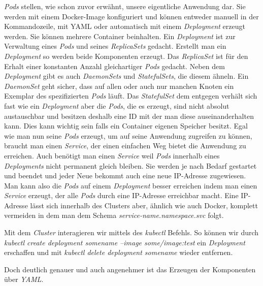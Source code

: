 \documentclass[12pt,a4paper]{scrartcl}
\begin{document}
\emph{Pods} stellen, wie schon zuvor erwähnt, unsere eigentliche Anwendung dar. Sie werden mit einem Docker-Image konfiguriert und können entweder manuell in der Kommandozeile, mit YAML oder automatisch mit einem \emph{Deployment} erzeugt werden. Sie können mehrere Container beinhalten.
Ein \emph{Deployment} ist zur Verwaltung eines \emph{Pods} und seines \emph{ReplicaSets} gedacht. Erstellt man ein \emph{Deployment} so werden beide Komponenten erzeugt.
Das \emph{ReplicaSet} ist für den Erhalt einer konstanten Anzahl gleichartiger \emph{Pods} gedacht. 
Neben dem \emph{Deployment} gibt es auch \emph{DaemonSets} und \emph{StatefulSets}, die diesem ähneln. 
Ein \emph{DaemonSet} geht sicher, dass auf allen oder auch nur manchen Knoten ein Exemplar des spezifizierten \emph{Pods} läuft. 
Das \emph{StatefulSet} dem entgegen verhält sich fast wie ein \emph{Deployment} aber die \emph{Pods}, die es erzeugt, sind nicht absolut austauschbar und besitzen deshalb eine ID mit der man diese auseinanderhalten kann. Dies kann wichtig sein falls ein Container eigenen Speicher besitzt. 
Egal wie man nun seine \emph{Pods} erzeugt, um auf seine Anwendung zugreifen zu können, braucht man einen \emph{Service}, der einen einfachen Weg bietet die Anwendung zu erreichen. Auch benötigt man einen \emph{Service} weil \emph{Pods} innerhalb eines \emph{Deployments} nicht permanent gleich bleiben. Sie werden je nach Bedarf gestartet und beendet und jeder Neue bekommt auch eine neue IP-Adresse zugewiesen. Man kann also die \emph{Pods} auf einem \emph{Deployment} besser erreichen indem man einen \emph{Service} erzeugt, der alle \emph{Pods} durch eine IP-Adresse erreichbar macht. Eine IP-Adresse lässt sich innerhalb des Clusters aber, ähnlich wie auch Docker, komplett vermeiden in dem man dem Schema \emph{service-name.namespace.svc} folgt.

Mit dem \emph{Cluster} interagieren wir mittels des \emph{kubectl} Befehls. So können wir durch \emph{kubectl create deployment somename --image some/image:test} ein \emph{Deployment} erschaffen und mit \emph{kubectl delete deployment somename} wieder entfernen. 

Doch deutlich genauer und auch angenehmer ist das Erzeugen der Komponenten über \emph{YAML}. 
\end{document}
